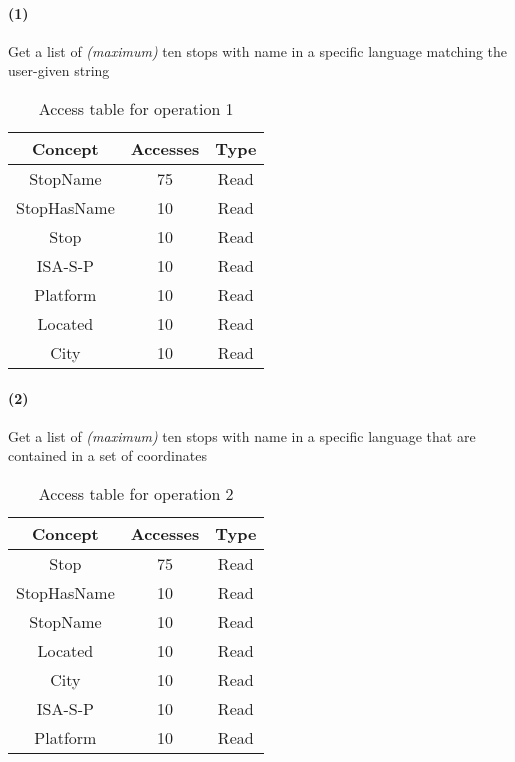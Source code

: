 	\paragraph{(1)} Get a list of \textit{(maximum)} ten stops with name in a specific language matching the user-given string
	\begin{table}[h]
		\centering
		\begin{tabular}{|c|c|c|}
			\hline
			\textbf{Concept} & \textbf{Accesses} & \textbf{Type} \\
			\hline
			StopName & 75 & Read \\ \hline
			StopHasName & 10 & Read \\ \hline
			Stop & 10 & Read \\ \hline
			ISA-S-P & 10 & Read \\ \hline
			Platform & 10 & Read \\ \hline
			Located & 10 & Read \\ \hline
			City & 10 & Read \\ \hline
		\end{tabular}
		\caption{Access table for operation 1}\label{tbl:conc.access-1}
	\end{table}
	
	\paragraph{(2)} Get a list of \textit{(maximum)} ten stops with name in a specific language that are contained in a set of coordinates
	\begin{table}[h]
		\centering
		\begin{tabular}{|c|c|c|}
			\hline
			\textbf{Concept} & \textbf{Accesses} & \textbf{Type} \\
			\hline
			Stop & 75 & Read \\ \hline 
			StopHasName & 10 & Read \\ \hline
			StopName & 10 & Read \\ \hline
			Located & 10 & Read \\ \hline
			City & 10 & Read \\ \hline
			ISA-S-P & 10 & Read \\ \hline
			Platform & 10 & Read \\ \hline
		\end{tabular}
		\caption{Access table for operation 2}\label{tbl:conc.access-2}
	\end{table}
	
	\newpage
